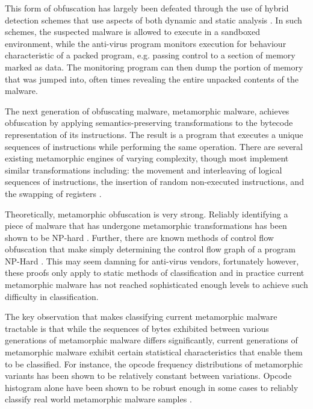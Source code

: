     This form of obfuscation has largely been defeated through the use of hybrid
    detection schemes that use aspects of both dynamic and static analysis
    \cite{polyunpack}.  In such schemes, the suspected malware is allowed to
    execute in a sandboxed environment, while the anti-virus program monitors
    execution for behaviour characteristic of a packed program, e.g. passing
    control to a section of memory marked as data. The monitoring program can
    then dump the portion of memory that was jumped into, often times revealing
    the entire unpacked contents of the malware.

    The next generation of obfuscating malware, metamorphic malware, achieves
    obfuscation by applying semantics-preserving transformations to the bytecode
    representation of its instructions. The result is a program that executes a
    unique sequences of instructions while performing the same operation. There
    are several existing metamorphic engines of varying complexity, though most
    implement similar transformations including: the movement and interleaving
    of logical sequences of instructions, the insertion of random non-executed
    instructions, and the swapping of registers \cite{simile}. 

    Theoretically, metamorphic obfuscation is very strong. Reliably identifying
    a piece of malware that has undergone metamorphic transformations has been
    shown to be NP-hard \cite{npcomplete}. Further, there are known methods of
    control flow obfuscation that make simply determining the control flow graph
    of a program NP-Hard \cite{controlflow}.  This may seem damning for
    anti-virus vendors, fortunately however, these proofs only apply to static
    methods of classification and in practice current metamorphic malware has
    not reached sophisticated enough levels to achieve such difficulty in
    classification.

    The key observation that makes classifying current metamorphic malware
    tractable is that while the sequences of bytes exhibited between various
    generations of metamorphic malware differs significantly, current
    generations of metamorphic malware exhibit certain statistical
    characteristics that enable them to be classified. For instance, the opcode
    frequency distributions of metamorphic variants has been shown to be
    relatively constant between variations. Opcode histogram alone have been
    shown to be robust enough in some cases to reliably classify real world
    metamorphic malware samples \cite{histogram}.

